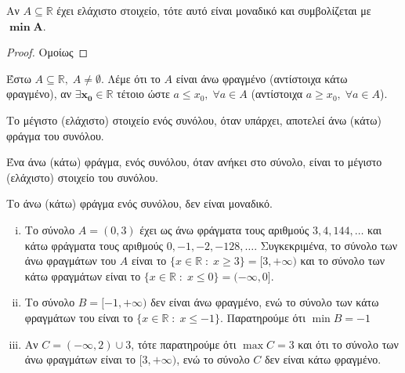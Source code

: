 \documentclass[main.tex]{subfiles}
\begin{document}
\begin{mypropbox}
Αν $ A \subseteq \mathbb{R} $ έχει ελάχιστο στοιχείο, τότε αυτό είναι 
μοναδικό και συμβολίζεται με $ \bm{\min A} $.
\end{mypropbox}

\begin{proof}
  Ομοίως 
\end{proof}

\begin{mydfnbox}
Έστω $ A \subseteq \mathbb{R}, \; A \neq \emptyset $. Λέμε ότι το 
  $A$ είναι άνω φραγμένο (αντίστοιχα κάτω φραγμένο), αν $ 
  \bm{\exists x_{0} \in \mathbb{R}}$ τέτοιο ώστε $ a \leq x_{0}, \; 
\forall a \in A$ (αντίστοιχα $ a \geq x_{0}, \; \forall a \in A $).
\end{mydfnbox}

\begin{rems}
\item {}
  \begin{myitemize}
    \item Το μέγιστο (ελάχιστο) στοιχείο ενός συνόλου, όταν υπάρχει, αποτελεί άνω
      (κάτω) φράγμα του συνόλου.
    \item Ένα  άνω (κάτω) φράγμα, ενός συνόλου, όταν ανήκει στο σύνολο, είναι 
      το μέγιστο (ελάχιστο) στοιχείο του συνόλου.
    \item Το άνω (κάτω) φράγμα ενός συνόλου, δεν είναι μοναδικό.
  \end{myitemize}
\end{rems}

\begin{example}
\item {}
  \begin{enumerate}[(i)]
    \item Το  σύνολο $ A = (0,3) $  έχει ως άνω φράγματα τους αριθμούς 
      $ 3, 4, 144, \ldots$ και κάτω φράγματα τους αριθμούς
      $ 0, -1, -2, -128, \ldots $. Συγκεκριμένα, το σύνολο των άνω φραγμάτων του 
      $A$ είναι το $ \{ x \in \mathbb{R} \; : \; x \geq 3 \} = [3,+\infty) $ και 
        το σύνολο των κάτω φραγμάτων είναι το 
        $ \{ x \in \mathbb{R} \; : \; x \leq 0 \} = (-\infty,0] $.

    \item Το σύνολο $ B = [-1,+\infty) $ δεν είναι άνω φραγμένο, ενώ το σύνολο των 
      κάτω φραγμάτων του είναι το $ \{ x \in \mathbb{R} \; : \; x \leq -1 \} $. 
      Παρατηρούμε ότι $ \min B =-1 $ 

    \item Αν $ C= (-\infty,2) \cup {3} $, τότε παρατηρούμε ότι $ \max C = 3 $ και ότι 
      το σύνολο των άνω φραγμάτων είναι το $[3,+\infty) $, ενώ το σύνολο $C$ δεν είναι 
      κάτω φραγμένο.
  \end{enumerate}
\end{example}
\end{document}
